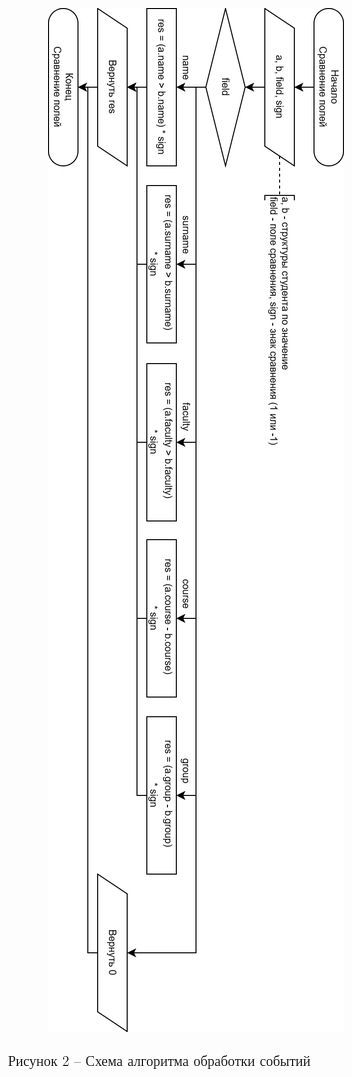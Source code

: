 \documentclass[a4paper,14pt]{extarticle}
\begin{document}
  \begin{figure}[h]
    \centering
    \includegraphics[width=0.3\linewidth]{images/s-2}
  \end{figure}
  \begin{center}
    Рисунок 2 – Схема алгоритма обработки событий
  \end{center}

  \pagebreak
\end{document}
